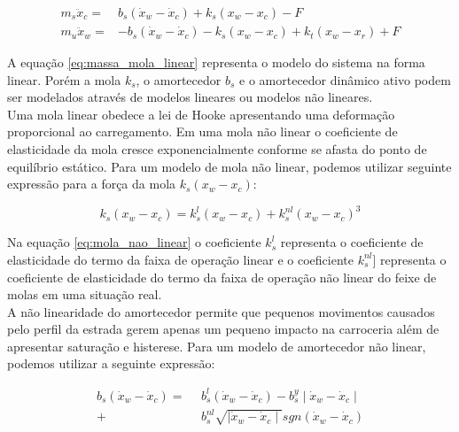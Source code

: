 \documentclass[a4paper]{ifacconf}
\begin{document}
    \begin{equation} \label{eq:massa_mola_linear}
    \begin{split}
        m_{s} \ddot{x}_{c} =&  b_{s}(\dot{x}_{w}-\dot{x}_{c}) + k_{s}(x_{w}-x_{c}) - F\ \\
        m_{u} \ddot{x}_{w} =& -b_{s}(\dot{x}_{w}-\dot{x}_{c}) - k_{s}(x_{w}-x_{c})+k_{t}(x_{w}-x_{r}) + F
    \end{split}
    \end{equation}
    
    A equação \ref{eq:massa_mola_linear} representa o modelo do sistema na forma linear. Porém a mola $k_s$, o amortecedor $b_s$ e o amortecedor dinâmico ativo podem ser modelados através de modelos lineares ou modelos não lineares. \\
    Uma mola linear obedece a lei de Hooke apresentando uma deformação proporcional ao carregamento. Em uma mola não linear o coeficiente de elasticidade da mola cresce exponencialmente conforme se afasta do ponto de equilíbrio estático.
    Para um modelo de mola não linear, podemos utilizar seguinte expressão para a força da mola $ k_{s}(x_{w}-x_{c})$:
    
    \begin{equation} \label{eq:mola_nao_linear}
        k_{s}(x_{w}-x_{c}) = k^{l}_{s}(x_{w}-x_{c})+k^{nl}_{s}(x_{w}-x_{c})^{3}
    \end{equation}
        
    Na equação \ref{eq:mola_nao_linear} o coeficiente $k^{l}_{s}$ representa o coeficiente de elasticidade do termo da faixa de operação linear e o coeficiente $k^{nl}_{s}$] representa o coeficiente de elasticidade do termo da faixa de operação não linear do feixe de molas em uma situação real.\\
    A não linearidade do amortecedor permite que pequenos movimentos causados pelo perfil da estrada gerem apenas um pequeno impacto na carroceria além de apresentar saturação e histerese. Para um modelo de amortecedor não linear, podemos utilizar a seguinte expressão:
 
    \begin{equation} \label{eq:amortecedor_nao_linear}
        \begin{aligned}
        b_{s}(\dot{x}_{w}-\dot{x}_{c}) =\ \ &b^{l}_{s}(\dot{x}_{w}-\dot{x}_{c}) - b^{y}_{s}\mid\dot{x}_{w}-\dot{x}_{c}\mid \\
        + &b^{nl}_{s}\sqrt{\mid\dot{x}_{w}-\dot{x}_{c}\mid}sgn(\dot{x}_{w}-\dot{x}_{c})  
        \end{aligned}
    \end{equation}
    
\end{document}
